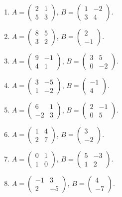\begin{enumerate}[label=\arabic*.,  leftmargin=*]
\item $A=\begin{pmatrix}2&1\\5&3\end{pmatrix}$, $B=\begin{pmatrix}1&-2\\3&4\end{pmatrix}$.
\item $A=\begin{pmatrix}8&5\\3&2\end{pmatrix}$, $B=\begin{pmatrix}2\\-1\end{pmatrix}$.
\item $A=\begin{pmatrix}9&-1\\4&1\end{pmatrix}$, $B=\begin{pmatrix}3&5\\0&-2\end{pmatrix}$.
\item $A=\begin{pmatrix}3&-5\\1&-2\end{pmatrix}$, $B=\begin{pmatrix}-1\\4\end{pmatrix}$.
\item $A=\begin{pmatrix}6&1\\-2&3\end{pmatrix}$, $B=\begin{pmatrix}2&-1\\0&5\end{pmatrix}$.
\item $A=\begin{pmatrix}1&4\\2&7\end{pmatrix}$, $B=\begin{pmatrix}3\\-2\end{pmatrix}$.
\item $A=\begin{pmatrix}0&1\\1&0\end{pmatrix}$, $B=\begin{pmatrix}5&-3\\1&2\end{pmatrix}$.
\item $A=\begin{pmatrix}-1&3\\2&-5\end{pmatrix}$, $B=\begin{pmatrix}4\\-7\end{pmatrix}$.

\end{enumerate}
